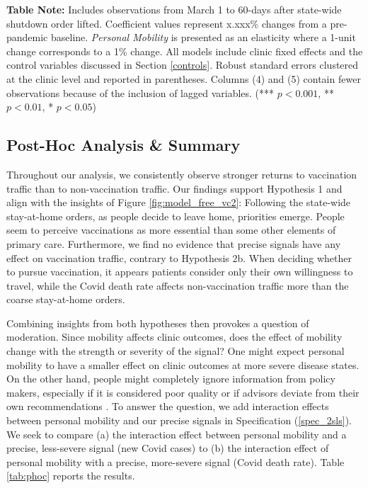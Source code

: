 \begin{table}[htbp]
{\begin{threeparttable}[t]
\begin{tablenotes}
      \footnotesize
      \item \textbf{Table Note:} Includes observations from March 1 to 60-days after state-wide shutdown order lifted. Coefficient values represent x.xxx\% changes from a pre-pandemic baseline. \textit{Personal Mobility} is presented as an elasticity where a 1-unit change corresponds to a 1\% change. All models include clinic fixed effects and the control variables discussed in Section \ref{controls}. Robust standard errors clustered at the clinic level and reported in parentheses. Columns (4) and (5) contain fewer observations because of the inclusion of lagged variables. (*** $p < 0.001$, ** $p < 0.01$, * $p < 0.05$)
    \end{tablenotes}
  \label{tab:H1H2}%
  \end{threeparttable} }
\end{table}%

\subsection{Post-Hoc Analysis \& Summary}
 Throughout our analysis, we consistently observe stronger returns to vaccination traffic than to non-vaccination traffic. Our findings support Hypothesis 1 and align with the insights of Figure \ref{fig:model_free_vc2}: Following the state-wide stay-at-home orders, as people decide to leave home, priorities emerge. People seem to perceive vaccinations as more essential than some other elements of primary care. Furthermore, we find no evidence that precise signals have any effect on vaccination traffic, contrary to Hypothesis 2b. When deciding whether to pursue vaccination, it appears patients consider only their own willingness to travel, while the Covid death rate affects non-vaccination traffic more than the coarse stay-at-home orders. 
 
 Combining insights from both hypotheses then provokes a question of moderation. Since mobility affects clinic outcomes, does the effect of mobility change with the strength or severity of the signal? One might expect personal mobility to have a smaller effect on clinic outcomes at more severe disease states. On the other hand, people might completely ignore information from policy makers, especially if it is considered poor quality \citep{Yaniv2000} or if advisors deviate from their own recommendations \citep{Schotter2003,Celen2010}. To answer the question, we add interaction effects between personal mobility and our precise signals in Specification (\ref{spec_2sls}). We seek to compare (a) the interaction effect between  personal mobility and a precise, less-severe signal (new Covid cases) to (b) the interaction effect of personal mobility with a precise, more-severe signal (Covid death rate). Table \ref{tab:phoc} reports the results.
 
